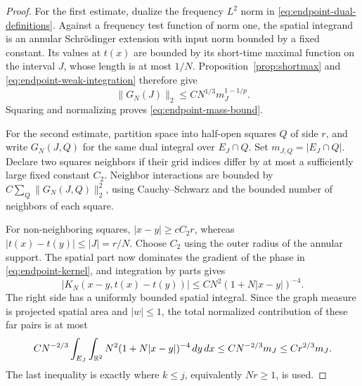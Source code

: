 \begin{proof}
For the first estimate, dualize the frequency $L^2$ norm in
\eqref{eq:endpoint-dual-definitions}.  Against a frequency test function
of norm one, the spatial integrand is an annular Schr\"odinger extension
with input norm bounded by a fixed constant.  Its values at $t(x)$ are
bounded by its short-time maximal function on the interval $J$, whose
length is at most $1/N$.  Proposition~\ref{prop:shortmax} and
\eqref{eq:endpoint-weak-integration} therefore give
\[
 \|G_N(J)\|_2\le C N^{1/3}m_J^{1-1/p}.
\]
Squaring and normalizing proves \eqref{eq:endpoint-mass-bound}.

For the second estimate, partition space into half-open squares $Q$ of
side $r$, and write $G_N(J,Q)$ for the same dual integral over
$E_J\cap Q$.  Set $m_{J,Q}=|E_J\cap Q|$.  Declare two squares neighbors
if their grid indices differ by at most a sufficiently large fixed
constant $C_2$.  Neighbor interactions are bounded by
$C\sum_Q\|G_N(J,Q)\|_2^2$, using Cauchy--Schwarz and the bounded number of
neighbors of each square.

For non-neighboring squares, $|x-y|\ge cC_2r$, whereas
$|t(x)-t(y)|\le |J|=r/N$.  Choose $C_2$ using the outer radius of the
annular support.  The spatial part now dominates the gradient of the
phase in \eqref{eq:endpoint-kernel}, and integration by parts gives
\[
 |K_N(x-y,t(x)-t(y))|
       \le C N^2(1+N|x-y|)^{-4}.
\]
The right side has a uniformly bounded spatial integral.  Since the
graph measure is projected spatial area and $|w|\le1$, the total
normalized contribution of these far pairs is at most
\begin{equation}
 C N^{-2/3}\int_{E_J}\int_{\mathbb R^2}
           N^2(1+N|x-y|)^{-4}\,dy\,dx
 \le C N^{-2/3}m_J\le C r^{2/3}m_J.
 \label{eq:endpoint-spatial-far-error}
\end{equation}
The last inequality is exactly where $k\le j$, equivalently $Nr\ge1$,
is used.


\end{proof}
